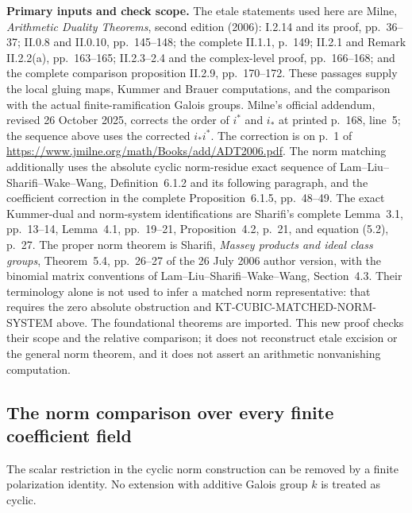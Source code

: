 \documentclass[11pt,a4paper]{article}
\theoremstyle{definition}
\renewcommand{\paragraph}[1]{\par\smallskip\noindent\textbf{#1}\quad\ignorespaces}
\begin{document}
\paragraph{Primary inputs and check scope.}
The etale statements used here are Milne,
\emph{Arithmetic Duality Theorems}, second edition (2006):
I.2.14 and its proof, pp.~36--37; II.0.8 and II.0.10,
pp.~145--148; the complete II.1.1, p.~149; II.2.1 and
Remark II.2.2(a), pp.~163--165; II.2.3--2.4 and the complex-level proof,
pp.~166--168; and the complete comparison proposition
II.2.9, pp.~170--172.  These passages supply the local
gluing maps, Kummer and Brauer computations, and the
comparison with the actual finite-ramification Galois
groups.  Milne's official addendum, revised 26 October 2025,
corrects the order of \(i^*\) and \(i_*\) at printed p.~168,
line~5; the sequence above uses the corrected \(i_*i^*\).
The correction is on p.~1 of
\url{https://www.jmilne.org/math/Books/add/ADT2006.pdf}.
The norm matching additionally uses the absolute cyclic
norm-residue exact sequence of Lam--Liu--Sharifi--Wake--Wang,
Definition~6.1.2 and its following paragraph, and the
coefficient correction in the complete Proposition~6.1.5,
pp.~48--49.  The exact Kummer-dual and norm-system
identifications are Sharifi's complete Lemma~3.1,
pp.~13--14, Lemma~4.1, pp.~19--21, Proposition~4.2,
p.~21, and equation (5.2), p.~27.
The proper norm theorem is Sharifi,
\emph{Massey products and ideal class groups},
Theorem~5.4, pp.~26--27 of the 26 July 2006 author
version, with the binomial matrix conventions of
Lam--Liu--Sharifi--Wake--Wang, Section~4.3.  Their
terminology alone is not used to infer a matched norm
representative: that requires the zero absolute
obstruction and KT-CUBIC-MATCHED-NORM-SYSTEM above.
The foundational theorems are imported.  This new proof
checks their scope and the relative comparison; it does
not reconstruct etale excision or the general norm
theorem, and it does not assert an arithmetic
nonvanishing computation.



\subsection{The norm comparison over every finite coefficient field}
\label{sec:kt-finite-coefficient-norm}

The scalar restriction in the cyclic norm construction can be
removed by a finite polarization identity.  No extension with
additive Galois group \(k\) is treated as cyclic.
\end{document}
